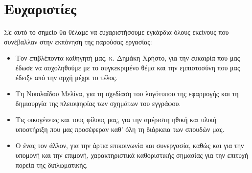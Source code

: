 \chapter*{Ευχαριστίες}

Σε αυτό το σημείο θα θέλαμε να ευχαριστήσουμε εγκάρδια όλους εκείνους που συνέβαλλαν στην εκπόνηση της παρούσας εργασίας:

\begin{itemize}
	\item Τον επιβλέποντα καθηγητή μας, κ. Δημάκη Χρήστο, για την ευκαιρία που μας έδωσε να ασχοληθούμε με το συγκεκριμένο θέμα και την εμπιστοσύνη που μας έδειξε από την αρχή μέχρι το τέλος.
	\item Τη Νικολαΐδου Μελίνα, για τη σχεδίαση του λογότυπου της εφαρμογής και τη δημιουργία της πλειοψηφίας των σχημάτων του εγγράφου.
	\item Τις οικογένειες και τους φίλους μας, για την αμέριστη ηθική και υλική υποστήριξη που μας προσέφεραν καθ' όλη τη διάρκεια των σπουδών μας.
	\item Ο ένας τον άλλον, για την άρτια επικοινωνία και συνεργασία, καθώς και για την υπομονή και την επιμονή, χαρακτηριστικά καθοριστικής σημασίας για την επιτυχή πορεία της διπλωματικής.
\end{itemize}
